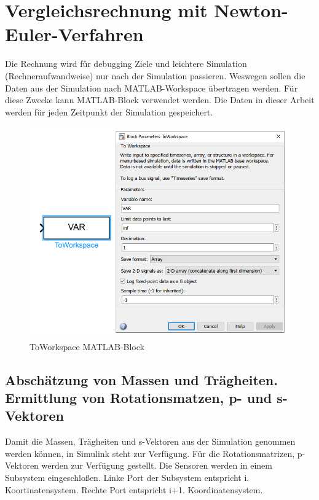 \section{Vergleichsrechnung mit Newton-Euler-Verfahren}

Die Rechnung wird für debugging Ziele und leichtere Simulation (Rechneraufwandweise) nur nach der Simulation passieren. 
Weswegen sollen die Daten aus der Simulation nach MATLAB-Workspace übertragen werden. Für diese Zwecke kann  MATLAB-Block verwendet werden.
Die Daten in dieser Arbeit werden für jeden Zeitpunkt der Simulation gespeichert.

	\begin{figure}[!htbp]
		\centering
		\includegraphics[width=1\linewidth]{grafic/to_workspace_block}
		\caption{ToWorkspace MATLAB-Block}
		\label{fig:simulink_to_workspace}
	\end{figure}

	\subsection{Abschätzung von Massen und Trägheiten. Ermittlung von Rotationsmatzen, p- und s-Vektoren}

Damit die Massen, Trägheiten und s-Vektoren aus der Simulation genommen werden können, in Simulink steht  zur Verfügung.
Für die Rotationsmatrizen, p-Vektoren werden  zur Verfügung gestellt.
Die Sensoren werden in einem Subsystem eingeschloßen. Linke Port der Subsystem entspricht i. Koortinatensystem. Rechte Port entspricht i+1. Koordinatensystem.

